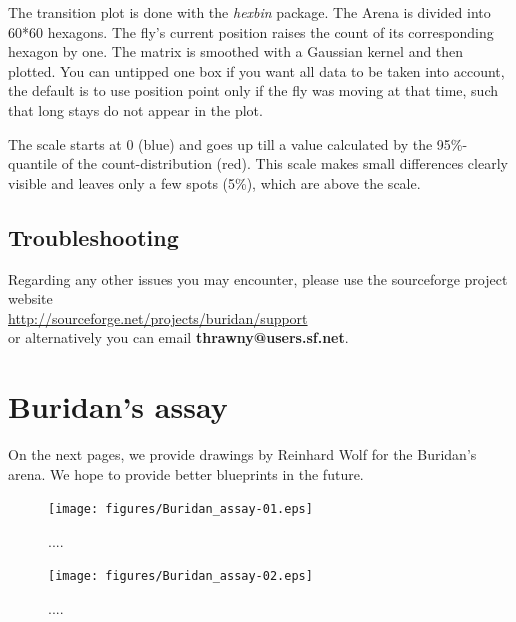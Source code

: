\documentclass[11pt,a4paper]{article}
\begin{document}
The transition plot is done with the {\it hexbin} package. The Arena is divided into 60*60 hexagons. The fly's current position raises the count of its corresponding hexagon by one. The matrix is smoothed with a Gaussian kernel and then plotted. You can untipped one box if you want all data to be taken into account, the default is to use position point only if the fly was moving at that time, such that long stays do not appear in the plot.

The scale starts at 0 (blue) and goes up till a value calculated by the 95\%-quantile of the count-distribution (red). This scale makes small differences clearly visible and leaves only a few spots (5\%), which are above the scale. 

\subsection{Troubleshooting}

Regarding any other issues you may encounter, please use the sourceforge project website \\
\url{http://sourceforge.net/projects/buridan/support} \\
or alternatively you can email {\bf thrawny@users.sf.net}. 

\newpage 

\section{Buridan's assay}
On the next pages, we provide drawings by Reinhard Wolf for the Buridan's arena. We hope to provide better blueprints in the future. 

\begin{figure}[h]
    	\mbox{\texttt{[image: figures/Buridan\_assay-01.eps]}}
 	\caption{....}
  	\label{fig:buridan-01}
 \end{figure}

\begin{figure}[h]
    	\mbox{\texttt{[image: figures/Buridan\_assay-02.eps]}}
 	\caption{....}
  	\label{fig:buridan-02}
 \end{figure}
 
\end{document}
